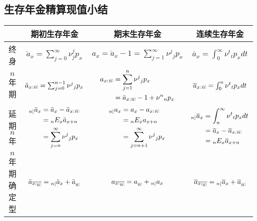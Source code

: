 \documentclass[lang=cn,10pt]{elegantbook}
\makeatletter
\DeclareRobustCommand{\annu}[1]{_{%
    \def\arraystretch{0}%
    \setlength\arraycolsep{1pt}%
    \setlength\arrayrulewidth{.2pt}%
    \begin{array}[b]{@{}c|}\hline
        \\[\arraycolsep]%
        \scriptstyle #1%
    \end{array}%
}}
\makeatother
\begin{document}
\subsection{生存年金精算现值小结}
\begin{center}
    \begin{tabular}{ c|c|c|c }
        \hline
        $ $ & 期初生存年金& 期末生存年金      & 连续生存年金   \\
         \hline
        终身& $\ddot a_x=\sum_{j=0}^{\infty}{\nu^j_jp_x}$ & $a_{x}=\ddot a_{x}-1=\sum^{\infty}_{j=1}\nu^{j}{}_jp_x$      & $\overline{a}_{x}=\int_0^{\infty} \nu^t{}_{t}p_xdt$           \\
        \hline
          $n$年期& $\ddot a_{x:}{}{\annu n}=\sum_{j=0}^{n-1}{\nu^j}{}_j p_x$ & $ \begin{aligned}
          a_{x:}{}\annu n&=\sum^{n}_{j=1}\nu^{j}{}_jp_x\\
          &=\ddot a_{x:}{}\annu n-1+\nu^{n}{}_{n}p_x
          \end{aligned}$ & $  \overline{a}_{x:}{}\annu{n}=\int_0^{n} \nu^t{}_{t}p_xdt$  \\
           \hline
          延期$n$年& $\begin{aligned}
          _{n|}\ddot a_{x}&=\ddot a_{x}-\ddot a_{x:}{}\annu n\\
          &={}_{n}E_{x}\ddot a_{x+n}\\
          &=\sum^{\infty}_{j=n}\nu^{j}{}_{j}p_{x}\\
          \end{aligned}$ & $\begin{aligned}
 _{n|}a_{x}& = a_{x}-a_{x:}{}\annu n \\
& = {}_{n}E_{x}a_{x+n}\\
&=\sum_{j=n+1}^{\infty}\nu^{j}{}_{j}p_{x}
\end{aligned}$ & $\begin{aligned}
          {}_{n|}\overline{a}_{x}&=\int_n^{\infty} \nu^t{}_{t}p_xdt\\
          &=\overline{a}_{x}-\overline{a}_{x:}{}\annu{n}\\
          &={}_nE_x\overline{a}_{x+n}
          \end{aligned}$ \\
           \hline
          $n$年期确定型& $\ddot a_{\overline{x:\annu n}}={}_{n|}\ddot a_{x}+\ddot a_{\annu n}$ & $a_{\overline{x:\annu{n}}}=a_{\annu n} + {}_{n|}a_{x}$ & $\overline a_{\overline{x:\annu{n}}}={}_{n|}\overline{a}_{x}+\overline a_{\annu {n}}$ \\
        \hline
    \end{tabular}
\end{center}
\end{document}
